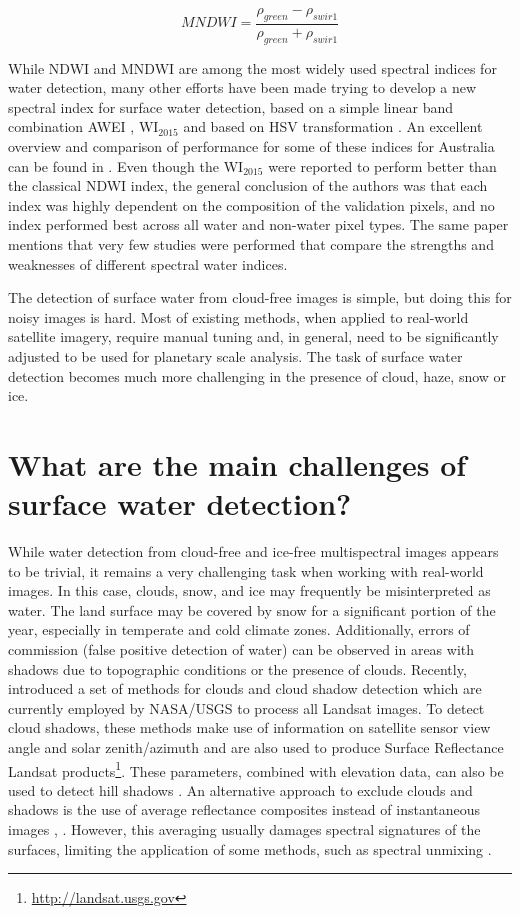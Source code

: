 \begin{equation}
MNDWI =  \frac{\rho_{green} - \rho_{swir1}}{\rho_{green} + \rho_{swir1}} 
\end{equation}

While \gls{NDWI} and \gls{MNDWI} are among the most widely used spectral indices for water detection, many other efforts have been made trying to develop a new spectral index for surface water detection, based on a simple linear band combination \gls{AWEI} \citet{feyisa2014automated}, WI$_{2015}$ \citet{fisher2016comparing} and based on \gls{HSV} transformation \citet{pekel2014near}. An excellent overview and comparison of performance for some of these indices for Australia can be found in \citet{fisher2016comparing}. Even though the WI$_{2015}$ were reported to perform better than the classical \gls{NDWI} index, the general conclusion of the authors was that each index was highly dependent on the composition of the validation pixels, and no index performed best across all water and non-water pixel types. The same paper mentions that very few studies were performed that compare the strengths and weaknesses of different spectral water indices. 

The detection of surface water from cloud-free images is simple, but doing this for noisy images is hard. Most of existing methods, when applied to real-world satellite imagery, require manual tuning and, in general, need to be significantly adjusted to be used for planetary scale analysis. The task of surface water detection becomes much more challenging in the presence of cloud, haze, snow or ice. 

\section{What are the main challenges of surface water detection?}

While water detection from cloud-free and ice-free multispectral images appears to be trivial, it remains a very challenging task when working with real-world images. In this case, clouds, snow, and ice may frequently be misinterpreted as water. The land surface may be covered by snow for a significant portion of the year, especially in temperate and cold climate zones. Additionally, errors of commission (false positive detection of water) can be observed in areas with shadows due to topographic conditions or the presence of clouds. Recently, \citet{Zhu2014, Zhu2012} introduced a set of methods for clouds and cloud shadow detection which are currently employed by NASA/USGS to process all Landsat images. To detect cloud shadows, these methods make use of information on satellite sensor view angle and solar zenith/azimuth and are also used to produce Surface Reflectance Landsat products\footnote{\url{http://landsat.usgs.gov}}. These parameters, combined with elevation data, can also be used to detect hill shadows \citet{tan2013improved}. An alternative approach to exclude clouds and shadows is the use of average reflectance composites instead of instantaneous images \citet{Potapov2012}, \citet{Hansen2013}. However, this averaging usually damages spectral signatures of the surfaces, limiting the application of some methods, such as spectral unmixing \citet{keshava2003survey}.

